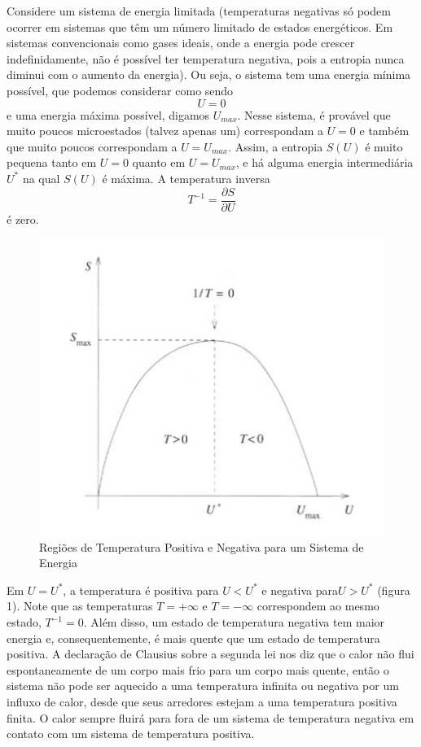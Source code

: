 \documentclass[12pt]{article}
\begin{document}
\begin{itemize}
     Considere um sistema de energia limitada (temperaturas negativas só podem ocorrer em sistemas que têm um número limitado de estados energéticos. Em sistemas convencionais como gases ideais, onde a energia pode crescer indefinidamente, não é possível ter temperatura negativa, pois a entropia nunca diminui com o aumento da energia). Ou seja, o sistema tem uma energia mínima possível, que podemos considerar como sendo
     \[
     U = 0
     \]
     e uma energia máxima possível, digamos $U_{max}$. Nesse sistema, é provável que muito poucos microestados (talvez apenas um) correspondam a $U = 0$ e também que muito poucos correspondam a $U = U_{max}$. Assim, a entropia $S(U)$ é muito pequena tanto em $U = 0$ quanto em $U = U_{max}$, e há alguma energia intermediária $U^{*}$ na qual $S(U)$ é máxima. A temperatura inversa 
     \[
     T^{-1} = \frac{\partial S}{\partial U}
     \]
     é zero.
   
\begin{figure}
    \centering
    \includegraphics[width=0.5\linewidth]{image2.png}
    \caption{Regiões de Temperatura Positiva e Negativa para um Sistema de Energia}
    \label{fig:enter-label}
\end{figure}
Em $U = U^{*}$, a temperatura é positiva para $U < U^{*}$ e negativa para$ U > U^{*}$ (figura 1). Note que as temperaturas $T = +\infty$ e $T = -\infty $ correspondem ao mesmo estado, $T^{-1} = 0$. Além disso, um estado de temperatura negativa tem maior energia e, consequentemente, é mais quente que um estado de temperatura positiva. A declaração de Clausius sobre a segunda lei nos diz que o calor não flui espontaneamente de um corpo mais frio para um corpo mais quente, então o sistema não pode ser aquecido a uma temperatura infinita ou negativa por um influxo de calor, desde que seus arredores estejam a uma temperatura positiva finita. O calor sempre fluirá para fora de um sistema de temperatura negativa em contato com um sistema de temperatura positiva.


\end{itemize}
\end{document}
